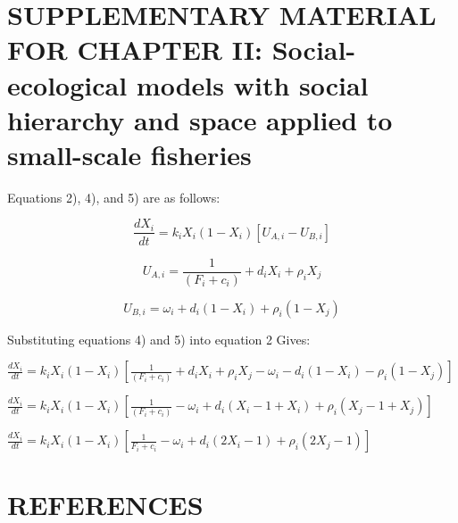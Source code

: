 \documentclass[
]{article}
\begin{document}
\newpage

\hypertarget{supplementary-material-for-chapter-ii-social-ecological-models-with-social-hierarchy-and-space-applied-to-small-scale-fisheries}{%
\section{SUPPLEMENTARY MATERIAL FOR CHAPTER II: Social-ecological models with social hierarchy and space applied to small-scale fisheries}\label{supplementary-material-for-chapter-ii-social-ecological-models-with-social-hierarchy-and-space-applied-to-small-scale-fisheries}}

Equations 2), 4), and 5) are as follows:

\begin{equation}
\tag{2}
\frac{dX_i}{dt} = k_iX_i(1-X_i)[U_{A,i} - U_{B,i}]
\end{equation}

\begin{equation}
\tag{4}
U_{A,i} = \frac{1}{(F_i + c_i)} + d_iX_i + \rho_i X_j
\end{equation}

\begin{equation}
\tag{5}
U_{B,i} = \omega_i + d_i(1-X_i) + \rho_i(1-X_j)
\end{equation}

Substituting equations 4) and 5) into equation 2 Gives:

\(\frac{dX_i}{dt} = k_iX_i(1-X_i)[\frac{1}{(F_i + c_i)} + d_iX_i + \rho_i X_j - \omega_i - d_i(1-X_i) - \rho_i(1-X_j)]\)

\(\frac{dX_i}{dt} = k_iX_i(1-X_i)[\frac{1}{(F_i + c_i)} - \omega_i + d_i(X_i-1+X_i) + \rho_i(X_j-1+X_j)]\)

\(\frac{dX_i}{dt} = k_iX_i(1-X_i) [\frac{1}{F_i+c_i} - \omega_i + d_i(2X_i - 1) + \rho_i(2X_j - 1)]\)

\newpage

\hypertarget{references}{%
\section*{REFERENCES}\label{references}}
\end{document}
